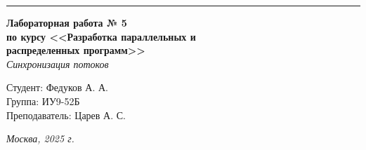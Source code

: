 \documentclass[a4paper, 14pt]{extarticle}
\begin{document}
\begin{titlepage}
\vspace*{-16pt}
\hspace{30pt}\rule{0.866\textwidth}{0.4pt}
  
\vspace{11em}

\begin{center}
\Large {\bf Лабораторная работа № 5} \\ 
\large {\bf по курсу <<Разработка параллельных и \\ распределенных программ>>} \\
\textit{Синхронизация потоков}

\end{center}\normalsize

\vspace{8em}


\begin{flushright}
 \begin{minipage}{0.5\linewidth}
      {Студент: Федуков А. А. \hspace*{15pt}\\ 
      Группа: ИУ9-52Б \\ 
      Преподаватель: Царев А. С. \hspace*{15pt}}
  \end{minipage}
\end{flushright}
\bigskip
\vfill
\begin{center}
\textsl{Москва, 2025 г.}
\end{center}
\end{titlepage}

\renewcommand{\ttdefault}{pcr}

\setlength{\tabcolsep}{3pt}
\newpage
\setcounter{page}{2}

{
  \hypersetup{linkcolor=black}
  \tableofcontents
}


\end{document}
